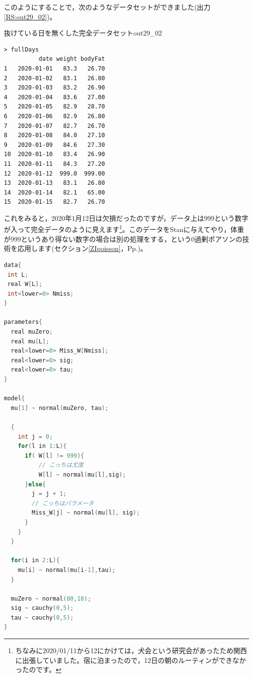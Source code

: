 \documentclass{ltjsbook}
\begin{document}
このようにすることで，次のようなデータセットができました(出力\ref{RS:out29_02})。
\begin{Rscreen}{抜けている日を無くした完全データセット}{out29_02}
\begin{verbatim}
> fullDays
          date weight bodyFat
1   2020-01-01   83.3   26.70
2   2020-01-02   83.1   26.80
3   2020-01-03   83.2   26.90
4   2020-01-04   83.6   27.00
5   2020-01-05   82.9   28.70
6   2020-01-06   82.9   26.80
7   2020-01-07   82.7   26.70
8   2020-01-08   84.0   27.10
9   2020-01-09   84.6   27.30
10  2020-01-10   83.4   26.90
11  2020-01-11   84.3   27.20
12  2020-01-12  999.0  999.00
13  2020-01-13   83.1   26.80
14  2020-01-14   82.1   65.00
15  2020-01-15   82.7   26.70\end{verbatim}
\end{Rscreen}
これをみると，2020年1月12日は欠損だったのですが，データ上は999という数字が入って完全データのように見えます\footnote{ちなみに2020/01/11から12にかけては，犬会という研究会があったため関西に出張していました。宿に泊まったので，12日の朝のルーティンができなかったのです。}。このデータをStanに与えてやり，体重が999というあり得ない数字の場合は別の処理をする，という0過剰ポアソンの技術を応用します(セクション\ref{ZIpoisson}，Pp.\pageref{ZIpoisson})。
\begin{lstlisting}[language=c++,label={stan::29_02},caption={欠損値補間のコード}]
data{
 int L;
 real W[L];
 int<lower=0> Nmiss;
}

parameters{
  real muZero;
  real mu[L];
  real<lower=0> Miss_W[Nmiss];
  real<lower=0> sig;
  real<lower=0> tau;
}

model{
  mu[1] ~ normal(muZero, tau);
  
  {
    int j = 0;
    for(l in 1:L){
      if( W[l] != 999){
          // こっちは尤度
          W[l] ~ normal(mu[l],sig);
      }else{
        j = j + 1;
        // こっちはパラメータ
        Miss_W[j] ~ normal(mu[l], sig);
      }
    }
  }
  
  for(i in 2:L){
    mu[i] ~ normal(mu[i-1],tau);
  }
  
  muZero ~ normal(80,10); 
  sig ~ cauchy(0,5);
  tau ~ cauchy(0,5);
}
\end{lstlisting}
\end{document}
